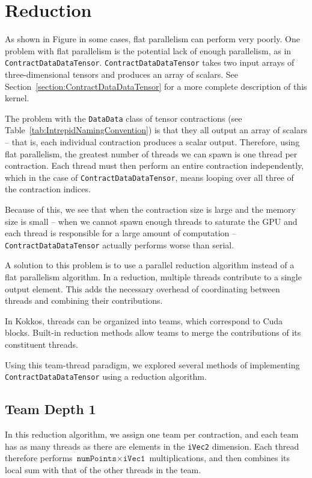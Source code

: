 \section{Reduction}
As shown in Figure %
in some cases, flat parallelism can perform very poorly.  One problem with flat
parallelism is the potential lack of enough parallelism, as in
\texttt{ContractDataDataTensor}.  \texttt{ContractDataDataTensor} takes two
input arrays of three-dimensional tensors and produces an array of scalars.  See
Section~\ref{section:ContractDataDataTensor} for a more complete description of
this kernel.

The problem with the \texttt{DataData} class of tensor contractions (see
Table~\ref{tab:IntrepidNamingConvention}) is that they all output an array of
scalars -- that is, each individual contraction produces a scalar output.
Therefore, using flat parallelism, the greatest number of threads we can spawn
is one thread per contraction.  Each thread must then perform an entire
contraction independently, which in the case of \texttt{ContractDataDataTensor},
means looping over all three of the contraction indices.

Because of this, we see that when the contraction size is large and the memory size is
small -- when we cannot spawn enough threads to saturate the GPU and each thread
is responsible for a large amount of computation --
\texttt{ContractDataDataTensor} actually performs worse than serial.

A solution to this problem is to use a parallel reduction algorithm instead of a
flat parallelism algorithm.  In a reduction, multiple threads contribute to a
single output element.  This adds the necessary overhead of coordinating between
threads and combining their contributions.

In Kokkos, threads can be organized into teams, which correspond to Cuda blocks.
Built-in reduction methods allow teams to merge the contributions of its
constituent threads.

Using this team-thread paradigm, we explored several methods of implementing
\texttt{ContractDataDataTensor} using a reduction algorithm.

\subsection{Team Depth 1}
    In this reduction algorithm, we assign one team per contraction, and each
    team has as many threads as there are elements in the \texttt{iVec2}
    dimension.  Each thread therefore performs $\texttt{numPoints} \times
    \texttt{iVec1}$ multiplications, and then combines its local sum with that
    of the other threads in the team.


